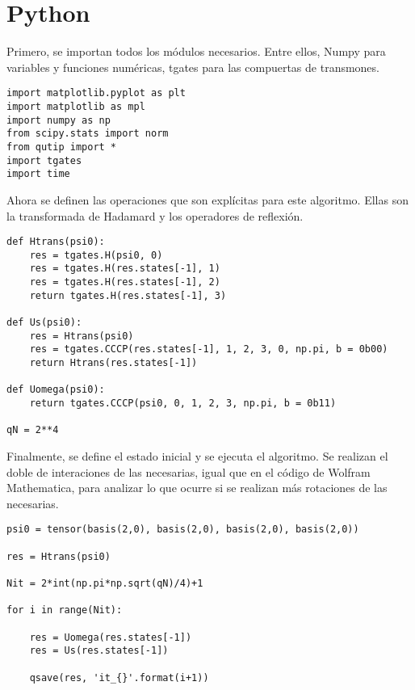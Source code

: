 \section{Python}

Primero, se importan todos los módulos necesarios. Entre ellos, Numpy para variables y funciones numéricas, tgates para las compuertas de transmones.

\begin{verbatim}
import matplotlib.pyplot as plt
import matplotlib as mpl
import numpy as np
from scipy.stats import norm
from qutip import *
import tgates
import time
\end{verbatim}

Ahora se definen las operaciones que son explícitas para este algoritmo. Ellas son la transformada de Hadamard y los operadores de reflexión.

\begin{verbatim}
def Htrans(psi0):
    res = tgates.H(psi0, 0)
    res = tgates.H(res.states[-1], 1)
    res = tgates.H(res.states[-1], 2)
    return tgates.H(res.states[-1], 3)

def Us(psi0):
    res = Htrans(psi0)
    res = tgates.CCCP(res.states[-1], 1, 2, 3, 0, np.pi, b = 0b00)
    return Htrans(res.states[-1])

def Uomega(psi0):
    return tgates.CCCP(psi0, 0, 1, 2, 3, np.pi, b = 0b11)

qN = 2**4
\end{verbatim}

Finalmente, se define el estado inicial y se ejecuta el algoritmo. Se realizan el doble de interaciones de las necesarias, igual que en el código de Wolfram Mathematica, para analizar lo que ocurre si se realizan más rotaciones de las necesarias.

\begin{verbatim}
psi0 = tensor(basis(2,0), basis(2,0), basis(2,0), basis(2,0))

res = Htrans(psi0)

Nit = 2*int(np.pi*np.sqrt(qN)/4)+1

for i in range(Nit):
    
    res = Uomega(res.states[-1])
    res = Us(res.states[-1])
    
    qsave(res, 'it_{}'.format(i+1))

\end{verbatim}

